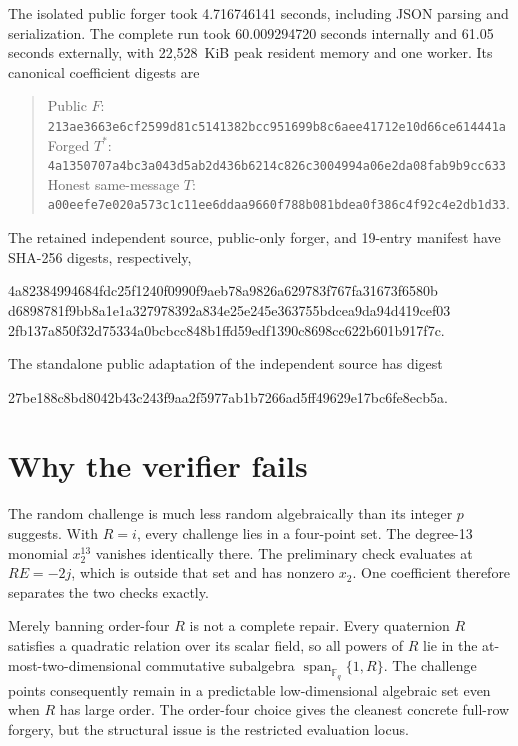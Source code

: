 \documentclass[10pt,a4paper]{article}
\newcommand{\F}{\mathbb{F}}
\begin{document}
The isolated public forger took 4.716746141 seconds, including JSON parsing
and serialization.  The complete run took 60.009294720 seconds internally
and 61.05 seconds externally, with 22,528~KiB peak resident memory and one
worker.  Its canonical coefficient digests are
\begin{quote}
\small
Public $F$:\\
\texttt{213ae3663e6cf2599d81c5141382bcc951699b8c6aee41712e10d66ce614441a}\\
Forged $T^*$:\\
\texttt{4a1350707a4bc3a043d5ab2d436b6214c826c3004994a06e2da08fab9b9cc633}\\
Honest same-message $T$:\\
\texttt{a00eefe7e020a573c1c11ee6ddaa9660f788b081bdea0f386c4f92c4e2db1d33}.
\end{quote}
The retained independent source, public-only forger, and 19-entry manifest
have SHA-256 digests, respectively,
\begin{center}
\small\ttfamily
4a82384994684fdc25f1240f0990f9aeb78a9826a629783f767fa31673f6580b\\
d6898781f9bb8a1e1a327978392a834e25e245e363755bdcea9da94d419cef03\\
2fb137a850f32d75334a0bcbcc848b1ffd59edf1390c8698cc622b601b917f7c.
\end{center}
The standalone public adaptation of the independent source has digest
\begin{center}
\small\ttfamily
27be188c8bd8042b43c243f9aa2f5977ab1b7266ad5ff49629e17bc6fe8ecb5a.
\end{center}

\section{Why the verifier fails}

The random challenge is much less random algebraically than its integer $p$
suggests.  With $R=i$, every challenge lies in a four-point set.  The
degree-13 monomial $x_2^{13}$ vanishes identically there.  The preliminary
check evaluates at $RE=-2j$, which is outside that set and has nonzero
$x_2$.  One coefficient therefore separates the two checks exactly.

Merely banning order-four $R$ is not a complete repair.  Every quaternion
$R$ satisfies a quadratic relation over its scalar field, so all powers of
$R$ lie in the at-most-two-dimensional commutative subalgebra
$\operatorname{span}_{\F_q}\{1,R\}$.  The challenge points consequently
remain in a predictable low-dimensional algebraic set even when $R$ has
large order.  The order-four choice gives the cleanest concrete full-row
forgery, but the structural issue is the restricted evaluation locus.
\end{document}
